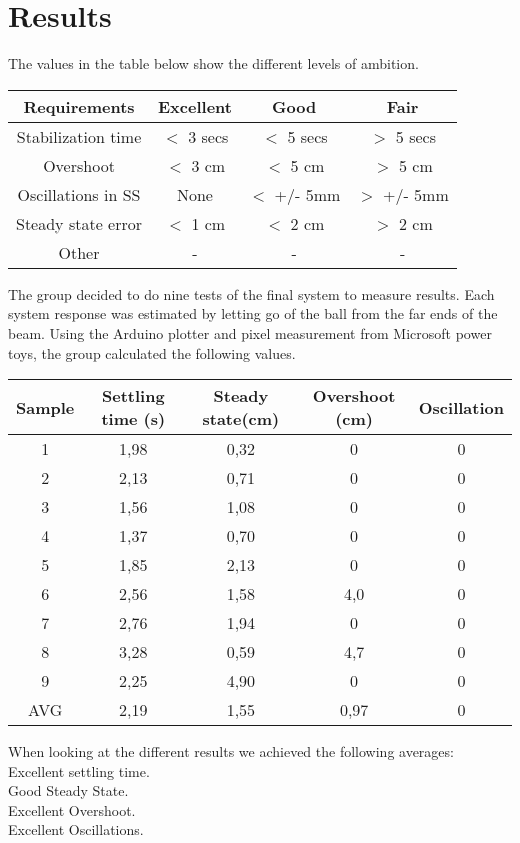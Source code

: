 \section{Results}

The values in the table below show the different levels of ambition.

\begin{center}
\begin{tabular}{ |c|c|c|c|}
 \hline
 Requirements & Excellent & Good & Fair \\
 \hline
 Stabilization time & $<$ 3 secs & $<$ 5 secs & $>$ 5 secs\\ 
 \hline
 Overshoot & $<$ 3 cm & $<$ 5 cm & $>$ 5 cm \\  
 \hline
 Oscillations in SS & None & $<$ +/- 5mm & $>$ +/- 5mm \\
 \hline
 Steady state error & $<$ 1 cm & $<$ 2 cm & $>$ 2 cm \\
 \hline
 Other & - & - & - \\
 \hline
\end{tabular}
\end{center}

The group decided to do nine tests of the final system to measure results. Each system response was estimated by letting go of the ball from the far ends of the beam. Using the Arduino plotter and pixel measurement from Microsoft power toys, the group calculated the following values.

\begin{center}
\begin{tabular}{ |c|c|c|c|c|}
\hline
Sample & Settling time (s) & Steady state(cm) & Overshoot (cm) & Oscillation\\
\hline
1 &  1,98 & 0,32 & 0 & 0\\ 
\hline
2 & 2,13 & 0,71 & 0 & 0\\  
\hline
3 &  1,56 & 1,08 & 0 & 0\\ 
\hline
4 &  1,37 & 0,70 & 0 & 0\\ 
\hline
5 &  1,85 & 2,13 & 0 & 0\\ 
\hline
6 &  2,56 & 1,58 & 4,0 & 0\\ 
\hline
7 &  2,76 & 1,94 & 0 & 0\\ 
\hline
8 &  3,28 & 0,59 & 4,7 & 0\\ 
\hline
9 &  2,25 & 4,90 & 0 & 0\\ 
\hline
AVG & 2,19 & 1,55 & 0,97 & 0 \\
\hline
\end{tabular}
\end{center}

When looking at the different results we achieved the following averages: \\
Excellent settling time. \\
Good Steady State.      \\
Excellent Overshoot.     \\
Excellent Oscillations.  \\
